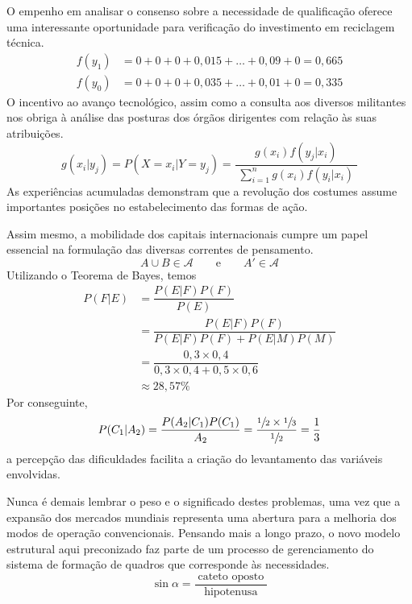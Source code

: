 \documentclass[fleqn]{icat-ufal}
\begin{document}
O empenho em analisar o consenso sobre a necessidade de qualificação oferece uma
interessante oportunidade para verificação do investimento em reciclagem
técnica. 
\begin{align*}
        f(y_1) & = 0 + 0 + 0 + 0,015 + \dots + 0,09 + 0 = 0,665 \\
        f(y_0) & = 0 + 0 + 0 + 0,035 + \dots + 0,01 + 0 = 0,335
\end{align*}
O incentivo ao avanço tecnológico, assim como a consulta aos diversos militantes nos obriga
à análise das posturas dos órgãos dirigentes com relação às suas atribuições.
\[
   g(x_i|y_j) = P(X=x_i|Y=y_j) = \dfrac{g(x_i) f(y_j|x_i)}{\displaystyle\;\sum_{i=1}^{n} g(x_i) f(y_i|x_i)\;}  
\]
As experiências acumuladas demonstram que a revolução dos costumes
assume importantes posições no estabelecimento das formas de ação. 

Assim mesmo, a mobilidade dos capitais internacionais cumpre um papel essencial
na formulação das diversas correntes de pensamento.
\[ A\cup B \in \mathcal{A} \qquad  \text{e} \qquad  A'\in \mathcal{A} \]
Utilizando o Teorema de Bayes, temos 
\begin{align*}
        P(F|E) & = \dfrac{P(E|F)P(F)}{P(E)}                                \\[3mm]
               & = \dfrac{P(E|F)P(F)}{P(E|F)P(F) + P(E|M)P(M)}             \\[3mm]
               & = \dfrac{0,3 \times 0,4}{0,3 \times 0,4 + 0,5 \times 0,6} \\[3mm]
               & \approx 28,57\%
\end{align*}
Por conseguinte,
\[
    P(C_{1}|A_{2}) = \dfrac{P(A_{2}|C_{1})P(C_{1})}{A_{2}} 
                   = \dfrac{\sfrac{1}{2} \times \sfrac{1}{3}}{\sfrac{1}{2}} 
                   = \frac{1}{3}
\]
a percepção das dificuldades facilita a criação do levantamento
das variáveis envolvidas. 

Nunca é demais lembrar o peso e o significado destes
problemas, uma vez que a expansão dos mercados mundiais representa uma abertura
para a melhoria dos modos de operação convencionais. Pensando mais a longo
prazo, o novo modelo estrutural aqui preconizado faz parte de um processo de
gerenciamento do sistema de formação de quadros que corresponde às necessidades. 
\[
    \sin \alpha = \frac{\;\text{cateto oposto}\;}{\text{hipotenusa}}
\]
\end{document}
